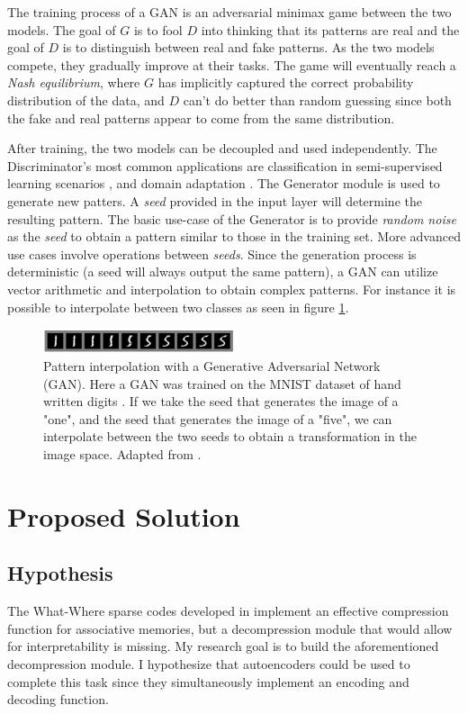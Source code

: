 \documentclass[runningheads]{llncs}
\begin{document}
The training process of a GAN is an adversarial minimax game between the two models. The goal of $G$ is to fool $D$ into thinking that its patterns are real and the goal of $D$ is to distinguish between real and fake patterns. As the two models compete, they gradually improve at their tasks. The game will eventually reach a \textit{Nash equilibrium}, where $G$ has implicitly captured the correct probability distribution of the data, and $D$ can't do better than random guessing since both the fake and real patterns appear to come from the same distribution.

After training, the two models can be decoupled and used independently. The Discriminator's most common applications are classification in semi-supervised learning scenarios \cite{salimans2016improved}, and domain adaptation \cite{bousmalis2017unsupervised}.
The Generator module is used to generate new patters. A \textit{seed} provided in the input layer will determine the resulting pattern. The basic use-case of the Generator is to provide \textit{random noise} as the \textit{seed} to obtain a pattern similar to those in the training set. More advanced use cases involve operations between \textit{seeds}. Since the generation process is deterministic (a seed will always output the same pattern), a GAN can utilize vector arithmetic and interpolation to obtain complex patterns. For instance it is possible to interpolate between two classes as seen in figure \ref{fig:GANS_interp}.

\begin{figure}[h]
    \centering
    \includegraphics[width=0.5\textwidth]{introduction/img/GANS_interp2.PNG}
    \caption{Pattern interpolation with a Generative Adversarial Network (GAN). Here a GAN was trained on the MNIST dataset of hand written digits \cite{lecun1998mnist}. If we take the seed that generates the image of a "one", and the seed that generates the image of a "five", we can interpolate between the two seeds to obtain a transformation in the image space. Adapted from \cite{goodfellow2014generative}.}
\label{fig:GANS_interp}
\end{figure}

\section{Proposed Solution}
\label{sec:proposedSolution}
\subsection{Hypothesis}
The What-Where sparse codes developed in \cite{sa2020storing} implement an effective compression function for associative memories, but a decompression module that would allow for interpretability is missing. My research goal is to build the aforementioned decompression module. I hypothesize that autoencoders could be used to complete this task since they simultaneously implement an encoding and decoding function.
\end{document}

